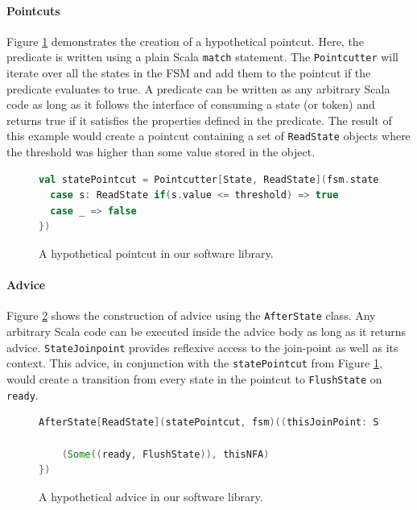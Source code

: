 \documentclass[conference]{IEEEtran}
\begin{document}
\paragraph{Pointcuts}
Figure \ref{fig:pointcut} demonstrates the creation of a hypothetical pointcut. Here, the predicate is written using a plain Scala \texttt{match} statement. The \texttt{Pointcutter} will iterate over all the states in the FSM and add them to the pointcut if the predicate evaluates to true. A predicate can be written as any arbitrary Scala code as long as it follows the interface of consuming a state (or token) and returns true if it satisfies the properties defined in the predicate. The result of this example would create a pointcut containing a set of \texttt{ReadState} objects where the threshold was higher than some value stored in the object.

\begin{figure}[ht]
    \centering
    \begin{lstlisting}[language = Scala]
val statePointcut = Pointcutter[State, ReadState](fsm.states, state => state match {
  case s: ReadState if(s.value <= threshold) => true
  case _ => false
})
    \end{lstlisting}
    \caption{A hypothetical pointcut in our software library.}
    \label{fig:pointcut}
\end{figure}

\paragraph{Advice}
Figure \ref{fig:advice} shows the construction of advice using the \texttt{AfterState} class. Any arbitrary Scala code can be executed inside the advice body as long as it returns advice. \texttt{StateJoinpoint} provides reflexive access to the join-point as well as its context. This advice, in conjunction with the \texttt{statePointcut} from Figure \ref{fig:pointcut}, would create a transition from every state in the pointcut to \texttt{FlushState} on \texttt{ready}. 

\begin{figure}[h]
    \centering
    \begin{lstlisting}[language = Scala]
AfterState[ReadState](statePointcut, fsm)((thisJoinPoint: StateJoinpoint[ReadState], thisFSM: FSM) => {
  
    (Some((ready, FlushState)), thisNFA)
})
    \end{lstlisting}
    \caption{A hypothetical advice in our software library.}
    \label{fig:advice}
\end{figure}
\end{document}

